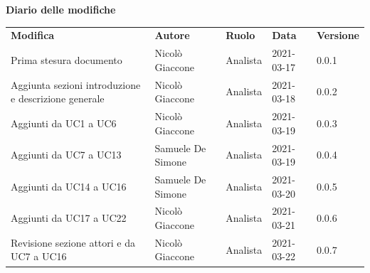 \documentclass[a4paper]{article}
\begin{document}
    \begin{center}
        \textbf{\Large Diario delle modifiche}\\
        \vspace{10px}
        \begin{table}[h!]
        \centering
        \renewcommand{\arraystretch}{1.8}
        \begin{tabular}{p{150px} p{90px} p{50px} p{60px} p{45px}}
            \rowcolor{logo!70} \textbf{Modifica} & \textbf{Autore} & \textbf{Ruolo} & \textbf{Data} & \textbf{Versione}\\
            Prima stesura documento & Nicolò Giaccone & Analista & 2021-03-17 & 0.0.1 \\
            Aggiunta sezioni introduzione \newline e descrizione generale & Nicolò Giaccone & Analista & 2021-03-18 & 0.0.2 \\    
            Aggiunti da UC1 a UC6 & Nicolò Giaccone & Analista & 2021-03-19 & 0.0.3 \\
            Aggiunti da UC7 a UC13 & Samuele De Simone & Analista & 2021-03-19 & 0.0.4 \\
            Aggiunti da UC14 a UC16 & Samuele De Simone & Analista & 2021-03-20 & 0.0.5 \\
            Aggiunti da UC17 a UC22 & Nicolò Giaccone & Analista & 2021-03-21 & 0.0.6 \\
            Revisione sezione attori e da UC7 a UC16  & Nicolò Giaccone & Analista & 2021-03-22 & 0.0.7 \\
        \end{tabular}
    \end{table}
    \end{center}

    \newpage
    \tableofcontents
    \listoffigures
    \newpage
    
    
    
    
\end{document}

